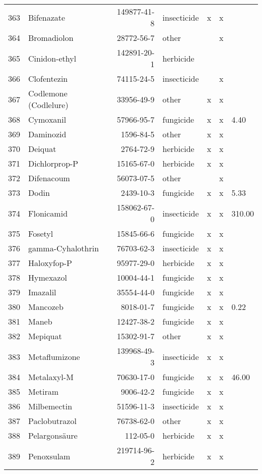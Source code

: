 \begin{longtable}{lp{3cm}rlp{0.5cm}p{0.5cm}p{1cm}}
  363 & Bifenazate & 149877-41-8 & insecticide & x & x &  \\ 
  364 & Bromadiolon & 28772-56-7 & other &  & x &  \\ 
  365 & Cinidon-ethyl & 142891-20-1 & herbicide &  &  &  \\ 
  366 & Clofentezin & 74115-24-5 & insecticide &  & x &  \\ 
  367 & Codlemone (Codlelure) & 33956-49-9 & other & x & x &  \\ 
  368 & Cymoxanil & 57966-95-7 & fungicide & x & x & 4.40 \\ 
  369 & Daminozid & 1596-84-5 & other & x & x &  \\ 
  370 & Deiquat & 2764-72-9 & herbicide & x & x &  \\ 
  371 & Dichlorprop-P & 15165-67-0 & herbicide & x & x &  \\ 
  372 & Difenacoum & 56073-07-5 & other &  & x &  \\ 
  373 & Dodin & 2439-10-3 & fungicide & x & x & 5.33 \\ 
  374 & Flonicamid & 158062-67-0 & insecticide & x & x & 310.00 \\ 
  375 & Fosetyl & 15845-66-6 & fungicide & x & x &  \\ 
  376 & gamma-Cyhalothrin & 76703-62-3 & insecticide & x & x &  \\ 
  377 & Haloxyfop-P & 95977-29-0 & herbicide & x & x &  \\ 
  378 & Hymexazol & 10004-44-1 & fungicide & x & x &  \\ 
  379 & Imazalil & 35554-44-0 & fungicide & x & x &  \\ 
  380 & Mancozeb & 8018-01-7 & fungicide & x & x & 0.22 \\ 
  381 & Maneb & 12427-38-2 & fungicide & x & x &  \\ 
  382 & Mepiquat & 15302-91-7 & other & x & x &  \\ 
  383 & Metaflumizone & 139968-49-3 & insecticide & x & x &  \\ 
  384 & Metalaxyl-M & 70630-17-0 & fungicide & x & x & 46.00 \\ 
  385 & Metiram & 9006-42-2 & fungicide & x & x &  \\ 
  386 & Milbemectin & 51596-11-3 & insecticide & x & x &  \\ 
  387 & Paclobutrazol & 76738-62-0 & other & x & x &  \\ 
  388 & Pelargonsäure & 112-05-0 & herbicide & x & x &  \\ 
  389 & Penoxsulam & 219714-96-2 & herbicide & x & x &  \\ 

\end{longtable}
